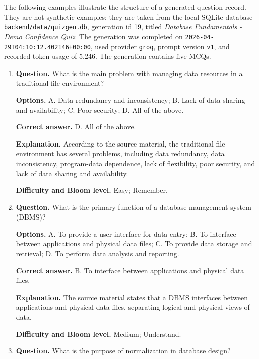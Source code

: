 \documentclass[12pt,a4paper]{article}
\begin{document}
The following examples illustrate the structure of a generated question
record. They are not synthetic examples; they are taken from the local
SQLite database \texttt{backend/data/quizgen.db}, generation id 19, titled
\textit{Database Fundamentals - Demo Confidence Quiz}. The generation was
completed on \texttt{2026-04-29T04:10:12.402146+00:00}, used provider
\texttt{groq}, prompt version \texttt{v1}, and recorded token usage of
5{,}246. The generation contains five MCQs.

\begin{enumerate}
  \item \textbf{Question.} What is the main problem with managing data
        resources in a traditional file environment?

        \textbf{Options.} A. Data redundancy and inconsistency; B. Lack of
        data sharing and availability; C. Poor security; D. All of the
        above.

        \textbf{Correct answer.} D. All of the above.

        \textbf{Explanation.} According to the source material, the
        traditional file environment has several problems, including data
        redundancy, data inconsistency, program-data dependence, lack of
        flexibility, poor security, and lack of data sharing and
        availability.

        \textbf{Difficulty and Bloom level.} Easy; Remember.

  \item \textbf{Question.} What is the primary function of a database
        management system (DBMS)?

        \textbf{Options.} A. To provide a user interface for data entry;
        B. To interface between applications and physical data files;
        C. To provide data storage and retrieval; D. To perform data
        analysis and reporting.

        \textbf{Correct answer.} B. To interface between applications and
        physical data files.

        \textbf{Explanation.} The source material states that a DBMS
        interfaces between applications and physical data files, separating
        logical and physical views of data.

        \textbf{Difficulty and Bloom level.} Medium; Understand.

  \item \textbf{Question.} What is the purpose of normalization in database
        design?


\end{enumerate}
\end{document}
